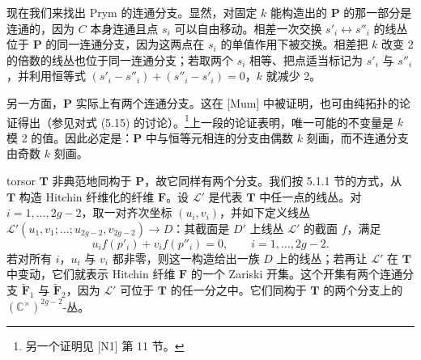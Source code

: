 \documentclass[11pt,a4paper]{article}
\begin{document}


现在我们来找出 Prym 的连通分支。显然，对固定 $k$ 能构造出的 $\boldsymbol{P}$ 的那一部分是连通的，因为 $C$ 本身连通且点 $s_i$ 可以自由移动。相差一次交换 $s'_i\leftrightarrow s''_i$ 的线丛位于 $\boldsymbol{P}$ 的同一连通分支，因为这两点在 $s_i$ 的单值作用下被交换。相差把 $k$ 改变 2 的倍数的线丛也位于同一连通分支；若取两个 $s_i$ 相等、把点适当标记为 $s'_i$ 与 $s''_i$，并利用恒等式 $(s'_i-s''_i)+(s''_i-s'_i) = 0$，$k$ 就减少 2。

另一方面，$\boldsymbol{P}$ 实际上有两个连通分支。这在 [Mum] 中被证明，也可由纯拓扑的论证得出（参见对式 (5.15) 的讨论）。\footnote{另一个证明见 [N1] 第 11 节。}上一段的论证表明，唯一可能的不变量是 $k$ 模 2 的值。因此必定是：$\boldsymbol{P}$ 中与恒等元相连的分支由偶数 $k$ 刻画，而不连通分支由奇数 $k$ 刻画。



torsor $\boldsymbol{T}$ 非典范地同构于 $\boldsymbol{P}$，故它同样有两个分支。我们按 5.1.1 节的方式，从 $\boldsymbol{T}$ 构造 Hitchin 纤维化的纤维 $\boldsymbol{F}$。设 $\mathcal{L}'$ 是代表 $\boldsymbol{T}$ 中任一点的线丛。对 $i=1,\dots,2g-2$，取一对齐次坐标 $(u_i,v_i)$，并如下定义线丛 $\mathcal{L}'(u_1,v_1;\dots;u_{2g-2},v_{2g-2})\to D$：其截面是 $D'$ 上线丛 $\mathcal{L}'$ 的截面 $f$，满足
\begin{equation}\tag{5.13}
u_i f(p'_i) + v_i f(p''_i) = 0,\qquad i = 1,\dots,2g-2.
\end{equation}
若对所有 $i$，$u_i$ 与 $v_i$ 都非零，则这一构造给出一族 $D$ 上的线丛；若再让 $\mathcal{L}'$ 在 $\boldsymbol{T}$ 中变动，它们就表示 Hitchin 纤维 $\boldsymbol{F}$ 的一个 Zariski 开集。这个开集有两个连通分支 $\widetilde{\boldsymbol{F}}_1$ 与 $\widetilde{\boldsymbol{F}}_2$，因为 $\mathcal{L}'$ 可位于 $\boldsymbol{T}$ 的任一分之中。它们同构于 $\boldsymbol{T}$ 的两个分支上的 $(\mathbb{C}^\times)^{2g-2}$-丛。
\end{document}
